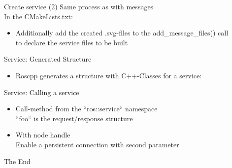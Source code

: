 \documentclass{beamer}
\begin{document}
\begin{frame}{Create service (2)}
	Same process as with messages\\
	In the CMakeLists.txt:\\
	\begin{itemize}
		\item Additionally add the created .svg-files to the add\_message\_files() call\\
		to declare the service files to be built
	\end{itemize}
\end{frame}

\begin{frame}{Service: Generated Structure}
	\begin{itemize}
		\item Roscpp generates a structure with C++-Classes for a service:
			
	\end{itemize}
\end{frame}

\begin{frame}{Service: Calling a service}
	\begin{itemize}
		\item Call-method from the ``ros::service`` namespace\\
		``foo`` is the request/response structure
			
		\item With node handle\\
		Enable a persistent connection with second parameter
		
	\end{itemize}
\end{frame}
\begin{frame}
\Huge{\centerline{The End}}
\end{frame}
\end{document}
